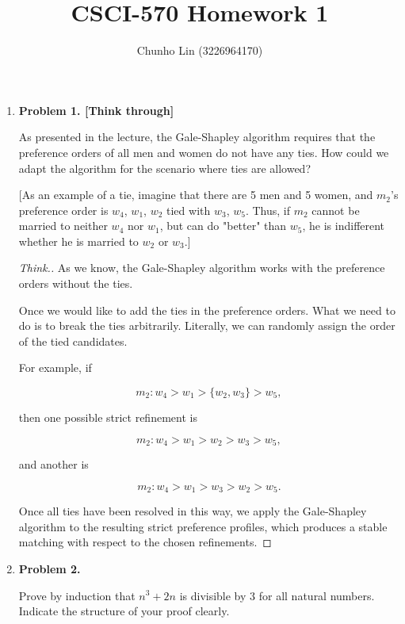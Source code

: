 \documentclass[11pt]{article}
\begin{document}
\author{Chunho Lin (3226964170)}
\title{CSCI-570 Homework 1}
\maketitle

\medskip

\begin{enumerate}

\item
\textbf{Problem 1. [Think through]}

As presented in the lecture, the Gale-Shapley algorithm requires that the preference orders of all men and women do not have any ties. How could we adapt the algorithm for the scenario where ties are allowed?

[As an example of a tie, imagine that there are 5 men and 5 women, and $m_2$'s preference order is $w_4$, $w_1$, $w_2$ tied with $w_3$, $w_5$. Thus, if $m_2$ cannot be married to neither $w_4$ nor $w_1$, but can do "better" than $w_5$, he is indifferent whether he is married to $w_2$ or $w_3$.]

\begin{proof}[Think.]

As we know, the Gale-Shapley algorithm works with the preference orders without the ties.

Once we would like to add the ties in the preference orders. What we need to do is to break the ties arbitrarily. Literally, we can randomly assign the order of the tied candidates.

For example, if

$$
{m_2} : w_4 > w_1 > \{w_2, w_3\} > w_5,
$$

then one possible strict refinement is

$$
{m_2} : w_4 > w_1 > w_2 > w_3 > w_5,
$$

and another is

$$
{m_2} : w_4 > w_1 > w_3 > w_2 > w_5.
$$

Once all ties have been resolved in this way, we apply the Gale-Shapley algorithm to the resulting strict preference profiles, which produces a stable matching with respect to the chosen refinements.

\end{proof}

\item
\textbf{Problem 2.}

Prove by induction that \(n^3 + 2n\) is divisible by \(3\) for all natural numbers. Indicate the structure of your proof clearly.


\end{enumerate}
\end{document}
